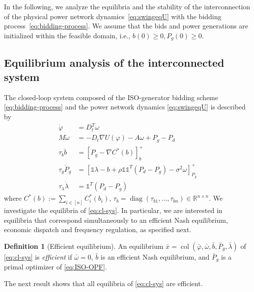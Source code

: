 \documentclass[journal]{IEEEtran}
\newcommand{\w}{\omega}
\newcommand{\1}{\mathds 1}
\newcommand{\vp}{\varphi}
\newcommand{\until}[1]{[#1]}
\renewcommand{\l}{\lambda}
\newcommand{\pproj}[2]{[#1]^+_{#2}}
\DeclareMathOperator{\col}{col}
\DeclareMathOperator{\diag}{diag}
\theoremstyle{remark}
\theoremstyle{definition}
\newtheorem{definition}[theorem]{Definition}
\newcommand{\margints}[1]{\marginpar{\color{blue}\tiny\ttfamily#1}}
\begin{document}
In the following, we analyze the equilibria and the stability of the
interconnection of the physical power network
dynamics~\eqref{eq:swingeqU} with the bidding
process~\eqref{eq:bidding-process}. We assume that the bids and power
generations are initialized within the feasible domain, i.e.,
$b(0)\geq0, P_g(0)\geq0$.
%
%

\subsection{Equilibrium analysis of the interconnected
  system}\label{sec:equilibrium-analysis}

The closed-loop system composed of the ISO-generator bidding scheme \eqref{eq:bidding-process} and the power network dynamics \eqref{eq:swingeqU} is described by
%
\begin{subequations}\label{eq:cl-sys}
  \begin{align}
    \dot \vp&=D_t^T\w\label{eq:vp-dyn}
    \\
    M\dot \w&=-D_t\nabla U(\vp)-A\w+P_g-P_d\label{eq:w-dyn}
    \\
    \tau_b \dot b&=\pproj{P_g-\nabla C^*(b)}{b}\label{eq:b-dyn}
    \\
    \tau_g\dot P_g&=\pproj{\1\l-b+\rho \1\1^T (P_d-P_g) -\sigma^2\w}{P_g}\label{eq:Pg-dyn}
    \\
    \tau_\l\dot \l&=\1^T(P_d-P_g)\label{eq:l-dyn}
  \end{align}
\end{subequations}
% 
where $C^*(b):=\sum_{i\in\until{n}}C_i^*(b_i)$, $\tau_{b}=\diag(\tau_{b1},\ldots,\tau_{bn})\in\mathbb R^{n\times n}$.
We investigate the equilibria of \eqref{eq:cl-sys}. In particular, we
are interested in equilibria that correspond simultaneously to an
efficient Nash equilibrium, economic dispatch and frequency
regulation, as specified next.
%
\begin{definition}[Efficient equilibrium]
  An equilibrium $\bar x=\col(\bar \vp,\bar \w,\bar b,\bar P_g,\bar
  \l)$ of \eqref{eq:cl-sys} is \emph{efficient} if $\bar \w=0$, $\bar
  b$ is an efficient Nash equilibrium, and $\bar P_g$ is a primal
  optimizer of \eqref{eq:ISO-OPF}.
\end{definition}
%
The next result shows that all equilibria of \eqref{eq:cl-sys} are
efficient.
%
\end{document}
